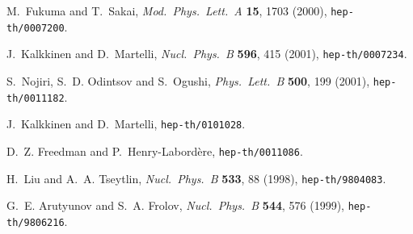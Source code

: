 \documentclass[a4paper,12pt]{article}
\begin{document}
\begin{thebibliography}{10}
M.~Fukuma and T.~Sakai, \emph{Mod.~Phys.~Lett.~A} \textbf{15}, 1703 (2000),
  \texttt{hep-th/0007200}.

J.~Kalkkinen and D.~Martelli, \emph{Nucl.~Phys.~B} \textbf{596}, 415 (2001),
  \texttt{hep-th/0007234}.

S.~Nojiri, S.~D. Odintsov and S.~Ogushi, \emph{Phys.~Lett.~B}
\textbf{500}, 199 (2001), \texttt{hep-th/0011182}.

J.~Kalkkinen and D.~Martelli, \texttt{hep-th/0101028}.

D.~Z. Freedman and P.~Henry-Labord\`ere, \texttt{hep-th/0011086}.

H.~Liu and A.~A. Tseytlin, \emph{Nucl.~Phys.~B} \textbf{533}, 88 (1998),
  \texttt{hep-th/9804083}.

G.~E. Arutyunov and S.~A. Frolov, \emph{Nucl.~Phys.~B} \textbf{544}, 576
  (1999), \texttt{hep-th/9806216}.

\end{thebibliography}
\end{document}
